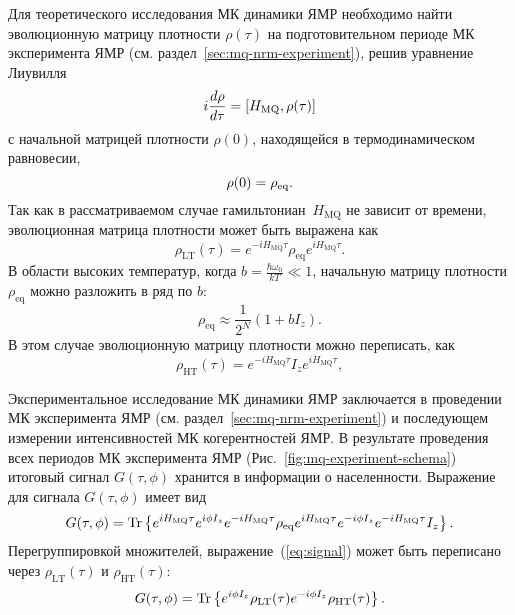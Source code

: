 Для теоретического исследования МК динамики ЯМР
необходимо найти эволюционную матрицу плотности $\rho(\tau)$
на подготовительном периоде МК эксперимента ЯМР (см. раздел~\ref{sec:mq-nrm-experiment}),
решив уравнение Лиувилля~\cite{Feldman2012}
%
\begin{equation}\label{eq:liouvile}
  i \frac{d \rho}{d \tau} = \left[H_\mathrm{MQ}, \rho(\tau)\right]
\end{equation}
%
с начальной матрицей плотности $\rho(0)$,
находящейся в термодинамическом равновесии,
%
\begin{equation}\label{eq:rho_init}
    \rho(0) = \rho_\mathrm{eq}.
\end{equation}
%
Так как в рассматриваемом случае гамильтониан~$H_\mathrm{MQ}$
не зависит от времени,
эволюционная матрица плотности может быть выражена как
\begin{equation}
  \label{eq:rho_eval_lt}
  \rho_\mathrm{LT} (\tau) = e^{-iH_\mathrm{MQ}\tau} \rho_\mathrm{eq} e^{iH_\mathrm{MQ}\tau}.
\end{equation}
В области высоких температур,
когда $b = \frac{\hbar\omega_{0}}{kT} \ll 1$,
начальную матрицу плотности $\rho_{\mathrm{eq}}$ можно разложить в ряд по $b$:
%
\begin{equation}
  \label{eq:rho_ht}
  \rho_{\mathrm{eq}} \approx \dfrac{1}{2^N} (1 + bI_z).
\end{equation}
%
В этом случае эволюционную матрицу плотности можно переписать, как
\begin{equation}\label{eq:rho_eval_ht}
  \rho_\mathrm{HT} (\tau) =  e^{-iH_\mathrm{MQ}\tau} I_z e^{iH_\mathrm{MQ}\tau},
\end{equation}

Экспериментальное исследование МК динамики ЯМР заключается в проведении
МК эксперимента ЯМР (см. раздел~\ref{sec:mq-nrm-experiment})
и последующем измерении интенсивностей МК когерентностей ЯМР.
В результате проведения всех периодов МК эксперимента ЯМР (Рис.~\ref{fig:mq-experiment-schema})
итоговый сигнал $G(\tau, \phi)$ хранится в информации о населенности\cite{Feldman1997}.
Выражение для сигнала $G(\tau, \phi)$ имеет вид
%
\begin{equation}
  \label{eq:signal}
   G(\tau, \phi)
   = \mathrm{Tr} \left\{ 
     e^{iH_\mathrm{MQ}\tau} e^{i\phi I_z} e^{-iH_\mathrm{MQ}\tau}
     \rho_\mathrm{eq}
     e^{iH_\mathrm{MQ}\tau} e^{-i\phi I_z} e^{-iH_\mathrm{MQ}\tau}
     I_z
     \right\}.
\end{equation}
%
Перегруппировкой множителей,
выражение~(\ref{eq:signal}) может быть переписано через
 $\rho_\mathrm{LT} (\tau)$ и $\rho_\mathrm{HT} (\tau)$:
%
\begin{equation}
  \label{eq:signal-short}
  G(\tau, \phi) = \mathrm{Tr} \left\{ 
   e^{i\phi I_z} \rho_\mathrm{LT} (\tau)
   e^{-i\phi I_z} \rho_\mathrm{HT} (\tau)
   \right\}.
\end{equation}


